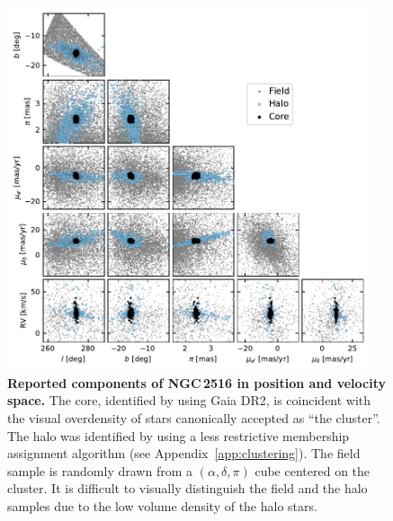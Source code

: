 \documentclass[12pt,twocolumn,tighten]{aastex63}
\begin{document}
\begin{figure}[t]
	\begin{center}
		\leavevmode
		\includegraphics[width=0.95\textwidth]{f1.pdf}
	\end{center}
	\vspace{-0.7cm}
  \caption{ {\bf Reported components of NGC\,2516 in position and
  velocity space.} The core, identified by
  \citet{cantatgaudin_gaia_2018} using Gaia DR2, is coincident with
  the visual overdensity of stars canonically accepted as ``the
  cluster''.  The halo was identified by
  \citet{kounkel_untangling_2019} using a less restrictive membership
  assignment algorithm (see Appendix~\ref{app:clustering}).  The field
  sample is randomly drawn from a $(\alpha, \delta, \pi)$ cube
  centered on the cluster.  It is difficult to visually distinguish
  the field and the halo samples due to the low volume density of the
  halo stars.
  \label{fig:gaia6d}
	}
\end{figure}
\end{document}
